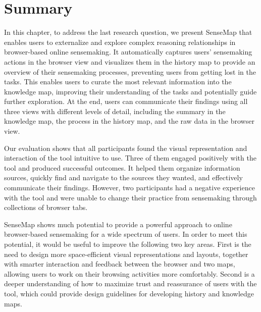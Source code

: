 \section{Summary}
In this chapter, to address the last research question, we present SenseMap that enables users to externalize and explore complex reasoning relationships in browser-based online sensemaking. It automatically captures users' sensemaking actions in the browser view and visualizes them in the history map to provide an overview of their sensemaking processes, preventing users from getting lost in the tasks. This enables users to curate the most relevant information into the knowledge map, improving their understanding of the tasks and potentially guide further exploration. At the end, users can communicate their findings using all three views with different levels of detail, including the summary in the knowledge map, the process in the history map, and the raw data in the browser view.

Our evaluation shows that all participants found the visual representation and interaction of the tool intuitive to use. Three of them engaged positively with the tool and produced successful outcomes. It helped them organize information sources, quickly find and navigate to the sources they wanted, and effectively communicate their findings. However, two participants had a negative experience with the tool and were unable to change their practice from sensemaking through collections of browser tabs.

SenseMap shows much potential to provide a powerful approach to online browser-based sensemaking for a wide spectrum of users. In order to meet this potential, it would be useful to improve the following two key areas. First is the need to design more space-efficient visual representations and layouts, together with smarter interaction and feedback between the browser and two maps, allowing users to work on their browsing activities more comfortably. Second is a deeper understanding of how to maximize trust and reassurance of users with the tool, which could provide design guidelines for developing history and knowledge maps.